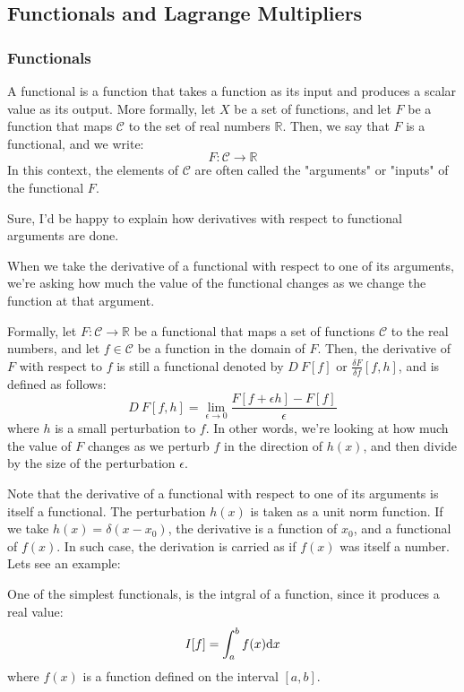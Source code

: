 \begin{subappendices}

\section{Functionals and Lagrange Multipliers}


\subsubsection*{Functionals}

A functional is a function that takes a function as its input and produces a scalar value as its output. More formally, let $X$ be a set of functions, and let $F$ be a function that maps $\mathcal C$ to the set of real numbers $\mathbb{R}$. Then, we say that $F$ is a functional, and we write:
$$F:\mathcal{C} \rightarrow\mathbb{R}$$
In this context, the elements of $\mathcal C$ are often called the "arguments" or "inputs" of the functional $F$.

Sure, I'd be happy to explain how derivatives with respect to functional arguments are done.

When we take the derivative of a functional with respect to one of its arguments, we're asking how much the value of the functional changes as we change the function at that argument.

Formally, let $F:\mathcal{C} \rightarrow \mathbb{R}$ be a functional that maps a set of functions $\mathcal{C}$ to the real numbers, and let $f \in \mathcal{C}$ be a function in the domain of $F$. Then, the derivative of $F$ with respect to $f$ is still a functional denoted by $D\:F[f]$ or $\frac{\delta F}{\delta f}[f,h]$, and is defined as follows:
$$D\:F[f, h] = \lim_{\epsilon\rightarrow 0} \frac{F[f+\epsilon h] - F[f]}{\epsilon}$$
where $h$ is a small perturbation to $f$. In other words, we're looking at how much the value of $F$ changes as we perturb $f$ in the direction of $h(x)$, and then divide by the size of the perturbation $\epsilon$.

Note that the derivative of a functional with respect to one of its arguments is itself a functional. The perturbation $h(x)$ is taken as a unit norm function. If we take $h(x) = \delta(x-x_0)$, the derivative is a function of $x_0$, and a functional of $f(x)$. In such case, the derivation is carried as if $f(x)$ was itself a number. Lets see an example:

One of the simplest functionals, is the intgral of a function, since it produces a real value:
\[ I[f] = \int_a^b f(x) \mathrm{d} x\]
where $f(x)$ is a function defined on the interval $[a,b]$.


\end{subappendices}
